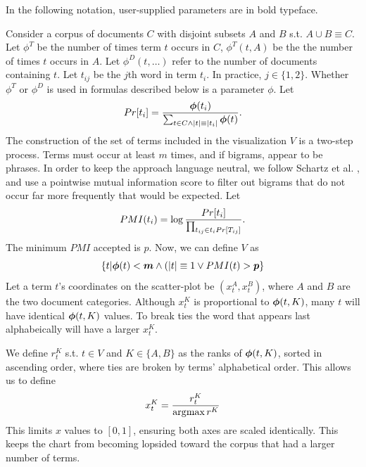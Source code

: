 \documentclass[11pt,a4paper]{article}
\begin{document}
In the following notation, user-supplied parameters are in bold typeface. 

Consider a corpus of documents $C$ with disjoint subsets $A$ and $B$ s.t. $A \cup B \equiv C$. Let $\phi^T$ be the number of times term $t$ occurs in $C$, $\phi^{T}(t,A)$ be the the number of times $t$ occurs in $A$. Let $\phi^{D}(t,\ldots)$ refer to the number of documents containing $t$.  Let $t_{ij}$ be the $j$th word in term $t_i$.  In practice, $j \in \{1,2\}$.   Whether $\phi^T$ or $\phi^D$ is used in formulas described below is a parameter \mbox{\boldmath$\phi$}.  Let
\begin{equation}
\vspace{-.2cm}
Pr[t_i] = \frac{\mbox{\boldmath$\phi$}(t_i)}{\sum_{t \in C\wedge|t|\equiv|t_i|} \mbox{\boldmath$\phi$}(t)}.
\vspace{-.1cm}
\end{equation}
The construction of the set of terms included in the visualization $V$ is a two-step process. Terms must occur at least \mbox{\boldmath$m$} times, and if bigrams, appear to be phrases.  In order to keep the approach language neutral, we follow Schartz et al. , and use a pointwise mutual information score to filter out bigrams that do not occur far more frequently that would be expected.  Let
\begin{equation}
\vspace{-.2cm}
PMI(t_i) = \log \frac{Pr[t_i]}{\prod_{t_{ij}\in t_i{Pr[T_{ij}]}}}.
\vspace{-.1cm}
\end{equation}
The minimum $PMI$ accepted is \mbox{\boldmath$p$}. Now, we can define $V$ as 
\begin{equation}
\{t|\mbox{\boldmath$\phi$}(t)<\mbox{\boldmath$m$} \wedge (|t| \equiv 1 \vee PMI(t) > \mbox{\boldmath$p$}\}
\end{equation}
Let a term $t$'s coordinates on the scatter-plot be $(x^{A}_{t}, x^{B}_t)$, where $A$ and $B$ are the two document categories. Although $x^{K}_t$ is proportional to $\mbox{\boldmath$\phi$}(t,K)$, many $t$ will have identical $\mbox{\boldmath$\phi$}(t,K)$ values.  To break ties the word that appears last alphabeically will have a larger $x^{K}_t$.

We define $r^{K}_t$ s.t. $t \in V$ and $K \in \{A,B\}$ as the ranks of $\mbox{\boldmath$\phi$}(t,K)$, sorted in ascending order, where ties are broken by terms' alphabetical order.  This allows us to define \vspace{-.2cm}
\begin{equation}
\vspace{-.2cm}
x^{K}_t = \frac{r^{K}_t}{\arg\!\max r^{K}}
\end{equation}
This limits $x$ values to $[0,1]$, ensuring both axes are scaled identically.  This keeps the chart from becoming lopsided toward the corpus that had a larger number of terms. 
\end{document}
